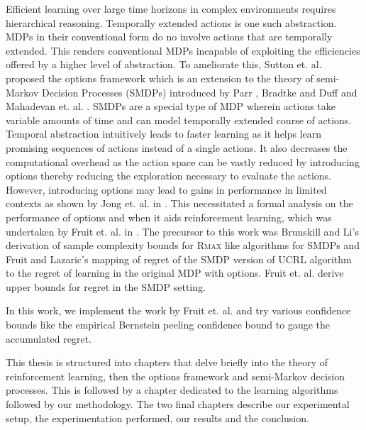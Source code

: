 Efficient learning over large time horizons in complex environments requires hierarchical reasoning.
Temporally extended actions is one such abstraction.
MDPs in their conventional form do no involve actions that are temporally extended.
This renders conventional MDPs incapable of exploiting the efficiencies offered by a higher level of abstraction.
To ameliorate this, Sutton et. al. proposed the options framework \cite{sutton_between_1999} which is an extension to the theory of semi-Markov Decision Processes (SMDPs) introduced by Parr \cite{parr_reinforcement_nodate}, Bradtke and Duff \cite{bradtke_reinforcement_1995} and Mahadevan et. al. \cite{mahadevan_self-improving_1997}.
SMDPs are a special type of MDP wherein actions take variable amounts of time and can model temporally extended course of actions.
Temporal abstraction intuitively leads to faster learning as it helps learn promising sequences of actions instead of a single actions.
It also decreases the computational overhead as the action space can be vastly reduced by introducing options thereby reducing the exploration necessary to evaluate the actions.
However, introducing options may lead to gains in performance in limited contexts as shown by Jong et. al. in \cite{jong_utility_2008}.
This necessitated a formal analysis on the performance of options and when it aids reinforcement learning, which was undertaken by Fruit et. al. in \cite{fruit_exploration--exploitation_2017}. 
The precursor to this work was Brunskill and Li's \cite{brunskill_pac-inspired_2014} derivation of sample complexity bounds for R\textsc{max} like algorithms for SMDPs and Fruit and Lazaric's \cite{fruit_exploration--exploitation_2017} mapping of regret of the SMDP version of UCRL algorithm to the regret of learning in the original MDP with options.
Fruit et. al. \cite{fruit_exploration--exploitation_2017} derive upper bounds for regret in the SMDP setting.

In this work, we implement the work by Fruit et. al.\cite{fruit_exploration--exploitation_2017} and try various confidence bounds like the empirical Bernstein peeling confidence bound to gauge the accumulated regret.

This thesis is structured into chapters that delve briefly into the theory of reinforcement learning, then the options framework and semi-Markov decision processes.
This is followed by a chapter dedicated to the learning algorithms followed by our methodology.
The two final chapters describe our experimental setup, the experimentation performed, our results and the conclusion.


\newpage
